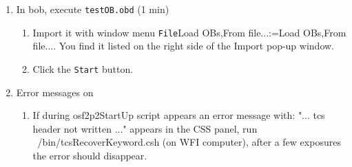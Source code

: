 \documentclass[11pt,fleqn,a4paper]{book}
\makeatletter
\def\menu#1#2{\texttt{#1}\ifx{}#2\else\@for\@x:=#2\do{$\rightarrow$\texttt{\@x}}\fi}
\def\wmenu#1#2{window menu \menu{#1}{#2}}
\def\fetchob{\wmenu{File}{Load OBs,From file...}}
\makeatother
\begin{document}
\begin{enumerate}
\begin{enumerate}
\begin{enumerate}
                \end{enumerate}
          \item In \gls{bob}, execute \texttt{testOB.obd} (1 min)
             \label{list:wfitest}
             \begin{enumerate}
               \item Import it with \fetchob. You find it listed on the right side of the Import pop-up window.
               \item Click the \texttt{Start} button. 
             \end{enumerate}
           \item Error messages on 
           \begin{enumerate}
           	\item  If during osf2p2StartUp script appears an error message with: "... tcs header not written ..." appears in the CSS panel, run ~/bin/tcsRecoverKeyword.csh (on WFI computer), after a few exposures the error should disappear.
           	

\end{enumerate}
\end{enumerate}
\end{enumerate}
\end{document}
